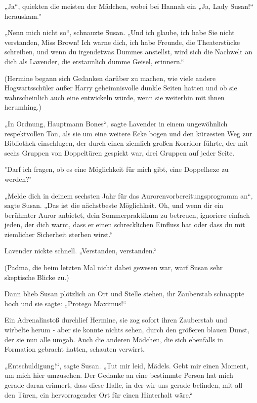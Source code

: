 {„Ja“, quiekten die meisten der Mädchen, wobei bei Hannah ein „Ja, Lady Susan!“ herauskam."

„Nenn mich nicht so“, schnauzte Susan. „Und ich glaube, ich habe Sie nicht verstanden, Miss Brown! Ich warne dich, ich habe Freunde, die Theaterstücke schreiben, und wenn du irgendetwas Dummes anstellst, wird sich die Nachwelt an dich als Lavender, die erstaunlich dumme Geisel, erinnern.“

(Hermine begann sich Gedanken darüber zu machen, wie viele andere Hogwartsschüler außer Harry geheimnisvolle dunkle Seiten hatten und ob sie wahrscheinlich auch eine entwickeln würde, wenn sie weiterhin mit ihnen herumhing.)

„In Ordnung, Hauptmann Bones“, sagte Lavender in einem ungewöhnlich respektvollen Ton, als sie um eine weitere Ecke bogen und den kürzesten Weg zur Bibliothek einschlugen, der durch einen ziemlich großen Korridor führte, der mit sechs Gruppen von Doppeltüren gespickt war, drei Gruppen auf jeder Seite.

"Darf ich fragen, ob es eine Möglichkeit für mich gibt, eine Doppelhexe zu werden?"

„Melde dich in deinem sechsten Jahr für das Aurorenvorbereitungsprogramm an“, sagte Susan. „Das ist die nächstbeste Möglichkeit. Oh, und wenn dir ein berühmter Auror anbietet, dein Sommerpraktikum zu betreuen, ignoriere einfach jeden, der dich warnt, dass er einen schrecklichen Einfluss hat oder dass du mit ziemlicher Sicherheit sterben wirst.“

Lavender nickte schnell. „Verstanden, verstanden.“

(Padma, die beim letzten Mal nicht dabei gewesen war, warf Susan sehr skeptische Blicke zu.)

Dann blieb Susan plötzlich an Ort und Stelle stehen, ihr Zauberstab schnappte hoch und sie sagte: „Protego Maximus!“

Ein Adrenalinstoß durchlief Hermine, sie zog sofort ihren Zauberstab und wirbelte herum - aber sie konnte nichts sehen, durch den größeren blauen Dunst, der sie nun alle umgab. Auch die anderen Mädchen, die sich ebenfalls in Formation gebracht hatten, schauten verwirrt.

„Entschuldigung!“, sagte Susan. „Tut mir leid, Mädels. Gebt mir einen Moment, um mich hier umzusehen. Der Gedanke an eine bestimmte Person hat mich gerade daran erinnert, dass diese Halle, in der wir uns gerade befinden, mit all den Türen, ein hervorragender Ort für einen Hinterhalt wäre.“

}
